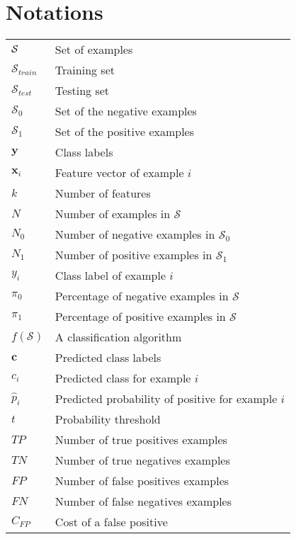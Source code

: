 
\chapter*{Notations}

\begin{tabularx}{\textwidth}{ l X }
$\cal S$ 		& Set of examples \\ 
$\mathcal{S}_{train}$ 	& Training set\\
$\mathcal{S}_{test}$ 	& Testing set \\
$\mathcal{S}_0$  & Set of the negative examples \\
$\mathcal{S}_1$  & Set of the positive examples \\
$\mathbf{y}$ 		& Class labels  \\  
$\mathbf{x}_i$ 		& Feature vector of example $i$ \\
$k$ 			& Number of features  \\
$N $ 			& Number of examples in $\mathcal{S}$ 	 \\
$N_0 $      & Number of negative examples in $\mathcal{S}_0$    \\
$N_1 $      & Number of positive examples in $\mathcal{S}_1$    \\
$y_i$ 			& Class label of example $i$  \\
$\pi_0$ & Percentage of negative examples in $\mathcal{S}$ \\
$\pi_1$ & Percentage of positive examples in $\mathcal{S}$ \\
$f(\mathcal{S})$ 	& A classification algorithm 	 \\
$\mathbf{c}$ 		& Predicted class labels \\  
$c_i$ 			& Predicted class for example $i$   \\
$\hat p_i$		& Predicted probability of positive for example $i$  \\
$t$ & Probability threshold \\ %
$TP$          & Number of true positives examples \\
$TN$          & Number of true negatives examples \\
$FP$          & Number of false positives examples \\
$FN$          & Number of false negatives examples \\
$C_{FP}$    & Cost of a false positive   \\ 

\end{tabularx}
